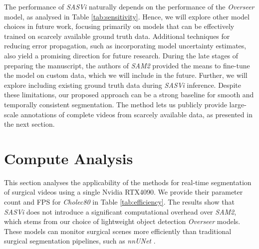 The performance of \emph{SASVi} naturally depends on the performance of the \emph{Overseer} model, as analysed in Table \ref{tab:sensitivity}. Hence, we will explore other model choices in future work, focusing primarily on models that can be effectively trained on scarcely available ground truth data. Additional techniques for reducing error propagation, such as incorporating model uncertainty estimates, also yield a promising direction for future research. During the late stages of preparing the manuscript, the authors of \emph{SAM2} \cite{ravi2024sam} provided the means to fine-tune the model on custom data, which we will include in the future. Further, we will explore including existing ground truth data during \emph{SASVi} inference. Despite these limitations, our proposed approach can be a strong baseline for smooth and temporally consistent segmentation. The method lets us publicly provide large-scale annotations of complete videos from scarcely available data, as presented in the next section. 

\begin{table}[htbp]
    \centering
    \caption{\textbf{Impact of Overseer Performance on SASVi.} The \emph{Overseer} is trained with fewer training samples to assess \emph{SASVi} performance under data scarcity constraints.}
    \label{tab:sensitivity}
\end{table}

\section{Compute Analysis}
\label{sec:app_compute}

This section analyses the applicability of the methods for real-time segmentation of surgical videos using a single Nvidia RTX4090. We provide their parameter count and FPS for \emph{Cholec80} in Table \ref{tab:efficiency}. The results show that \emph{SASVi} does not introduce a significant computational overhead over \emph{SAM2}, which stems from our choice of lightweight object detection \emph{Overseer} models. These models can monitor surgical scenes more efficiently than traditional surgical segmentation pipelines, such as \emph{nnUNet} \cite{isensee2021nnu}.

